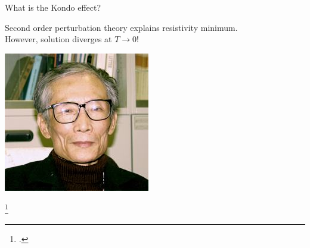\documentclass[10pt,aspectratio=169]{beamer}
\begin{document}
\begin{frame}{What is the Kondo effect?}
\begin{minipage}{0.8\textwidth}
Second order perturbation theory explains resistivity minimum.\\
However, solution \alert{diverges} at \(T \to 0\)!
\end{minipage}
\begin{minipage}{0.1\textwidth}
\includegraphics[width=\textwidth]{kondo.jpg}\\
\end{minipage}
\footcite{deHaas1939,Sarachik1964,Heeger1969,kondo1964resistance}
\end{frame}
\end{document}
